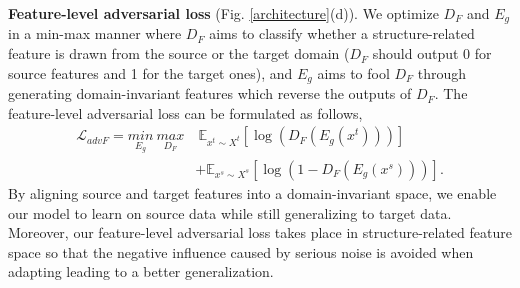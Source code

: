 \documentclass[10pt,journal,compsoc,twocolumn ]{IEEEtran}
\begin{document}
\textbf{Feature-level adversarial loss} (Fig. \ref{architecture}(d)). %
We optimize $D_F$ and $E_g$ in a min-max manner where $D_F$ aims to classify whether a structure-related feature is drawn from the source or the target domain ($D_F$ should output 0 for source features and 1 for the target ones), and $E_g$ aims to fool $D_F$ through generating domain-invariant features which reverse the outputs of $D_F$. The feature-level adversarial loss can be formulated as follows,
\begin{equation}
\begin{split}
\mathcal{L}_{advF}=\underset{E_g}{min}\ \underset{D_F}{max} &\ \mathbb{E}_{x^t\sim X^t}\left [ \log\left ( D_F\left ( E_g\left ( x^t \right ) \right ) \right ) \right ]\\
&+\mathbb{E}_{x^s\sim X^s}\left [ \log\left (1- D_F\left ( E_g\left ( x^s \right ) \right ) \right ) \right ]. \label{advf}
\end{split}
\end{equation}
By aligning source and target features into a domain-invariant space, we enable our model to learn on source data while still generalizing to target data. Moreover, our feature-level adversarial loss takes place in structure-related feature space so that the negative influence caused by serious noise is avoided when adapting leading to a better generalization.
\end{document}
